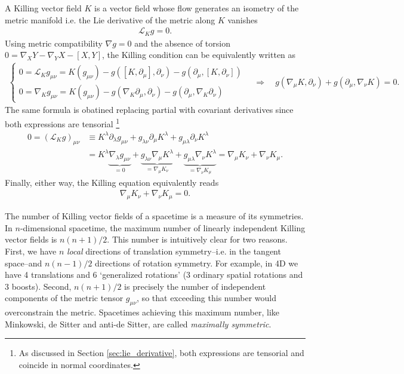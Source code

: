 \begin{mytheorem}
%
A Killing vector field $K$ is a vector field whose flow generates an isometry of the metric manifold i.e. the Lie derivative of the metric along $K$ vanishes
\begin{align}
    \mathcal{L}_K g = 0.
\end{align}
Using metric compatibility $\nabla g=0$ and the absence of torsion $0=\nabla_X Y-\nabla_Y X - [X,Y]$, the Killing condition can be equivalently written as
\begin{align}
    \begin{cases}
    0= \mathcal{L}_K g_{\mu\nu} =K(g_{\mu\nu}) - g([K,\partial_\mu],\partial_\nu) - g(\partial_\mu,[K,\partial_\nu]) \\
    0 = \nabla_K g_{\mu\nu}= K(g_{\mu\nu}) -g(\nabla_K \partial_\mu,\partial_\nu) - g(\partial_\mu, \nabla_K \partial_\nu)
    \end{cases}\quad \Rightarrow \quad g(\nabla_\mu K, \partial_\nu) + g(\partial_\mu, \nabla_\nu K) =0.
\end{align}
The same formula is obatined replacing partial with covariant derivatives since both expressions are tensorial \footnote{As discussed in Section \ref{sec:lie_derivative}, both expressions are tensorial and coincide in normal coordinates.}
\begin{align}
    0=\left(\mathcal{L}_K g\right)_{\mu\nu}&\equiv K^\lambda \partial_\lambda g_{\mu\nu} + g_{\lambda\nu} \partial_\mu K^\lambda + g_{\mu\lambda} \partial_\nu K^\lambda\\
    &= K^\lambda \underbrace{\nabla_\lambda g_{\mu\nu}}_{=0} + \underbrace{g_{\lambda\nu} \nabla_\mu K^\lambda}_{=\nabla_\mu K_\nu} + \underbrace{g_{\mu\lambda} \nabla_\nu K^\lambda}_{=\nabla_\nu K_\mu}
    = \nabla_\mu K_\nu + \nabla_\nu K_\mu.
\end{align}
Finally, either way, the Killing equation equivalently reads
\begin{align}
    \nabla_\mu K_\nu + \nabla_\nu K_\mu = 0.
\end{align}

The number of Killing vector fields of a spacetime is a measure of its symmetries.
In $n$-dimensional spacetime, the maximum number of linearly independent Killing vector fields is $n(n+1)/2$.
This number is intuitively clear for two reasons.
First, we have $n$ \emph{local} directions of translation symmetry--i.e. in the tangent space--and $n(n-1)/2$ directions of rotation symmetry.
For example, in 4D we have 4 translations and 6 `generalized rotations' (3 ordinary spatial rotations and 3 boosts).
Second, $n(n+1)/2$ is precisely the number of independent components of the metric tensor $g_{\mu\nu}$, so that exceeding this number would overconstrain the metric.
Spacetimes achieving this maximum number, like Minkowski, de Sitter and anti-de Sitter, are called \emph{maximally symmetric}.
%
\end{mytheorem}



